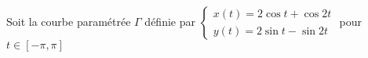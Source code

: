 \documentclass[a4paper]{tp_um}
\begin{document}
\begin{enumerate}
	
	
\end{enumerate}

		
		
		
		
		
		
  Soit la courbe paramétrée $\Gamma$ définie par $\begin{cases}x(t)= 2\cos t + \cos 2t \\ y(t) = 2\sin t - \sin 2t \end{cases}$ pour $t\in[-\pi,\pi]$
\end{document}
